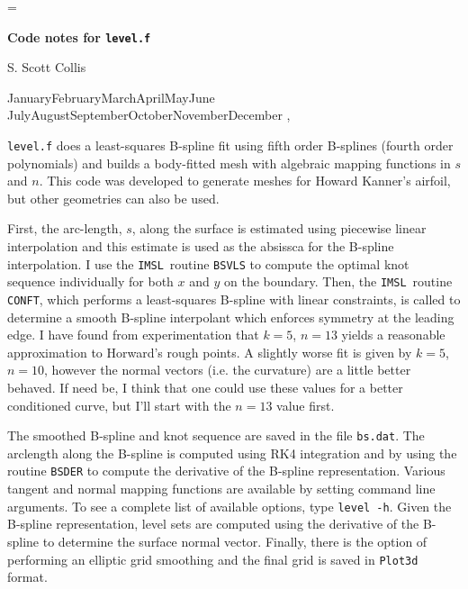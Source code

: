 \magnification=
\def\IMSL{{\tt IMSL}}
\def\today{\ifcase\month\or
  January\or February\or March\or April\or May\or June\or
  July\or August\or September\or October\or November\or December\fi
  \space\number\day, \number\year}

\centerline{\bf Code notes for {\tt level.f}}
\medskip
\centerline{S. Scott Collis}
\smallskip
\centerline{\today}
\bigskip

{\tt level.f} does a least-squares B-spline fit using fifth order B-splines
(fourth order polynomials) and builds a body-fitted mesh with algebraic
mapping functions in $s$ and $n$.  This code was developed to generate meshes
for Howard Kanner's airfoil, but other geometries can also be used.

First, the arc-length, $s$, along the surface is estimated using piecewise
linear interpolation and this estimate is used as the absissca for the
B-spline interpolation.  I use the \IMSL\ routine {\tt BSVLS} to compute the
optimal knot sequence individually for both $x$ and $y$ on the boundary.
Then, the \IMSL\ routine {\tt CONFT}, which performs a least-squares B-spline
with linear constraints, is called to determine a smooth B-spline interpolant
which enforces symmetry at the leading edge.  I have found from
experimentation that $k=5$, $n=13$ yields a reasonable approximation to
Horward's rough points.  A slightly worse fit is given by $k=5$, $n=10$,
however the normal vectors (i.e. the curvature) are a little better behaved.
If need be, I think that one could use these values for a better conditioned
curve, but I'll start with the $n=13$ value first.

The smoothed B-spline and knot sequence are saved in the file {\tt bs.dat}.
The arclength along the B-spline is computed using RK4 integration and by
using the routine {\tt BSDER} to compute the derivative of the B-spline
representation.  Various tangent and normal mapping functions are available by
setting command line arguments.  To see a complete list of available options,
type {\tt level -h}.  Given the B-spline representation, level sets are
computed using the derivative of the B-spline to determine the surface normal
vector.  Finally, there is the option of performing an elliptic grid smoothing
and the final grid is saved in {\tt Plot3d} format.

\bye





